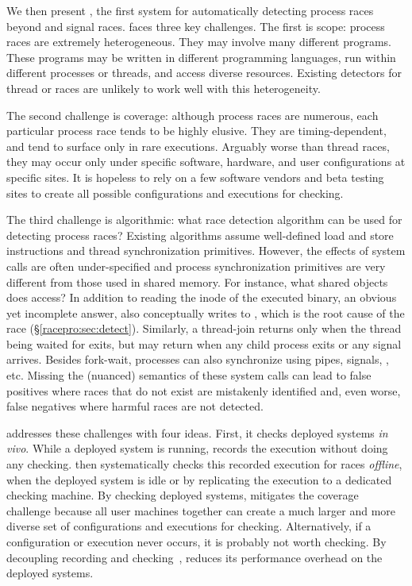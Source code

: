 We then present \racepro, the first system for automatically detecting
process races beyond \toctou and signal races.  
\racepro faces three key challenges.  The first is scope:
process races are extremely heterogeneous.  They may involve many
different programs.  These programs may be written in different 
programming languages, run within different processes or threads,
and access diverse resources.  Existing detectors for thread or \toctou
races are unlikely to work well with this heterogeneity.

The second challenge is coverage: although process races are numerous,
each particular process race tends to be highly elusive.
They are timing-dependent, and tend to surface only in rare
executions.  Arguably worse than thread races, they may occur only under
specific software, hardware, and user configurations at specific
sites.  It is hopeless to rely on a few software vendors and beta
testing sites to create all possible configurations and executions for
checking. 

The third challenge is algorithmic: what race detection algorithm can
be used for detecting process races?  Existing algorithms assume
well-defined load and store instructions and thread synchronization
primitives.   However, the effects of system calls are often
under-specified and process synchronization primitives are very
different from those used in shared memory. For instance, what shared objects
does  access?  In addition to reading the inode of the
executed binary, an obvious yet incomplete answer,  also
conceptually writes to , which is the root cause of the
 race (\S\ref{racepro:sec:detect}).  Similarly, a
thread-join returns only when the thread being waited for exits, but
 may return when any child process exits or any signal arrives.
Besides fork-wait, processes can also synchronize using
pipes, signals, , etc.
Missing the (nuanced) semantics of these system calls can lead to false positives
where races that do not exist are mistakenly identified and, even
worse, false negatives where harmful races are not detected. 

\racepro addresses these challenges with four ideas.  First, it checks
deployed systems \emph{in vivo}.  While a deployed system is running, \racepro
records the execution without doing any checking.  \racepro then
systematically checks this recorded execution for races \emph{offline},
when the deployed system is idle or by replicating the execution to a
dedicated checking machine.  By checking deployed systems, \racepro mitigates
the coverage challenge because all user machines together can create a
much larger and more diverse set of configurations and executions for
checking.  Alternatively, if a configuration or execution never occurs, it
is probably not worth checking.  By decoupling recording and
checking~\cite{decouple:usenix08}, \racepro reduces its performance overhead
on the deployed systems.

